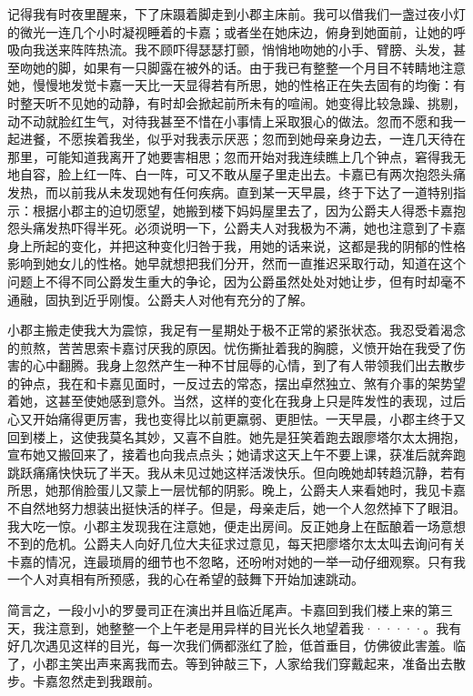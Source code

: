 \documentclass[12pt, UTF8]{ctexbook}
\begin{document}
\par 记得我有时夜里醒来，下了床蹑着脚走到小郡主床前。我可以借我们一盏过夜小灯的微光一连几个小时凝视睡着的卡嘉；或者坐在她床边，俯身到她面前，让她的呼吸向我送来阵阵热流。我不顾吓得瑟瑟打颤，悄悄地吻她的小手、臂膀、头发，甚至吻她的脚，如果有一只脚露在被外的话。由于我已有整整一个月目不转睛地注意她，慢慢地发觉卡嘉一天比一天显得若有所思，她的性格正在失去固有的均衡：有时整天听不见她的动静，有时却会掀起前所未有的喧闹。她变得比较急躁、挑剔，动不动就脸红生气，对待我甚至不惜在小事情上采取狠心的做法。忽而不愿和我一起进餐，不愿挨着我坐，似乎对我表示厌恶；忽而到她母亲身边去，一连几天待在那里，可能知道我离开了她要害相思；忽而开始对我连续瞧上几个钟点，窘得我无地自容，脸上红一阵、白一阵，可又不敢从屋子里走出去。卡嘉已有两次抱怨头痛发热，而以前我从未发现她有任何疾病。直到某一天早晨，终于下达了一道特别指示：根据小郡主的迫切愿望，她搬到楼下妈妈屋里去了，因为公爵夫人得悉卡嘉抱怨头痛发热吓得半死。必须说明一下，公爵夫人对我极为不满，她也注意到了卡嘉身上所起的变化，并把这种变化归咎于我，用她的话来说，这都是我的阴郁的性格影响到她女儿的性格。她早就想把我们分开，然而一直推迟采取行动，知道在这个问题上不得不同公爵发生重大的争论，因为公爵虽然处处对她让步，但有时却毫不通融，固执到近乎刚愎。公爵夫人对他有充分的了解。
\par 小郡主搬走使我大为震惊，我足有一星期处于极不正常的紧张状态。我忍受着渴念的煎熬，苦苦思索卡嘉讨厌我的原因。忧伤撕扯着我的胸臆，义愤开始在我受了伤害的心中翻腾。我身上忽然产生一种不甘屈辱的心情，到了有人带领我们出去散步的钟点，我在和卡嘉见面时，一反过去的常态，摆出卓然独立、煞有介事的架势望着她，这甚至使她感到意外。当然，这样的变化在我身上只是阵发性的表现，过后心又开始痛得更厉害，我也变得比以前更羸弱、更胆怯。一天早晨，小郡主终于又回到楼上，这使我莫名其妙，又喜不自胜。她先是狂笑着跑去跟廖塔尔太太拥抱，宣布她又搬回来了，接着也向我点点头；她请求这天上午不要上课，获准后就奔跑跳跃痛痛快快玩了半天。我从未见过她这样活泼快乐。但向晚她却转趋沉静，若有所思，她那俏脸蛋儿又蒙上一层忧郁的阴影。晚上，公爵夫人来看她时，我见卡嘉不自然地努力想装出挺快活的样子。但是，母亲走后，她一个人忽然掉下了眼泪。我大吃一惊。小郡主发现我在注意她，便走出房间。反正她身上在酝酿着一场意想不到的危机。公爵夫人向好几位大夫征求过意见，每天把廖塔尔太太叫去询问有关卡嘉的情况，连最琐屑的细节也不忽略，还吩咐对她的一举一动仔细观察。只有我一个人对真相有所预感，我的心在希望的鼓舞下开始加速跳动。
\par 简言之，一段小小的罗曼司正在演出并且临近尾声。卡嘉回到我们楼上来的第三天，我注意到，她整整一个上午老是用异样的目光长久地望着我······。我有好几次遇见这样的目光，每一次我们俩都涨红了脸，低首垂目，仿佛彼此害羞。临了，小郡主笑出声来离我而去。等到钟敲三下，人家给我们穿戴起来，准备出去散步。卡嘉忽然走到我跟前。
\end{document}
